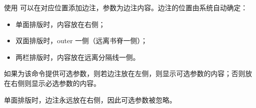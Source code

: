 \documentclass[twoside]{book}
\begin{document}
\setlength{\parsep}{8pt}

使用 \boxforcmd{\\marginpar{}} 可以在对应位置添加边注，参数为边注内容。边注的位置由系统自动确定：

\begin{itemize}[itemsep=0pt,parsep=0pt]
    \item 单面排版时，内容放在右侧；
    \item 双面排版时，outer 一侧（远离书脊一侧）；
    \item 两栏排版时，内容放在远离分隔线一侧。
\end{itemize}
如果为该命令提供可选参数，则若边注放在左侧，则显示可选参数的内容；否则放在右侧则显示必选参数的内容。

单面排版时，边注永远放在右侧，因此可选参数被忽略。
\end{document}

